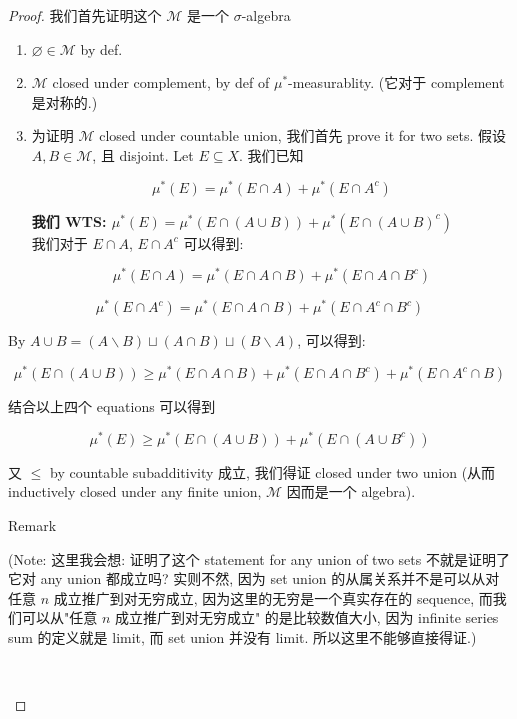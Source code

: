 \documentclass{qlnotes-export}
\begin{document}
\begin{proof}

我们首先证明这个 \(\mathcal{M}\) 是一个 \(\sigma\)-algebra

\begin{enumerate}
\item
  \(\varnothing \in \mathcal{M}\) by def.
\item
  \(\mathcal{M}\) closed under complement, by def of \(\mu^{\ast}\)-measurablity. (它对于 complement 是对称的.)
\item
  为证明 \(\mathcal{M}\) closed under countable union, 我们首先 prove it for two sets. 假设 \(A,B \in \mathcal{M}\), 且 disjoint. Let \(E \subseteq X\). 我们已知

  \[\mu^{\ast}(E) = \mu^{\ast}(E \cap A) + \mu^{\ast}(E \cap A^{c})\]

  \textbf{我们 WTS: \(\mu^{\ast}(E) = \mu^{\ast}(E \cap (A \cup B)) + \mu^{\ast}(E \cap (A \cup B)^{c})\)}\\
  我们对于 \(E \cap A\), \(E \cap A^{c}\) 可以得到:

  \[\mu^{\ast}(E \cap A) = \mu^{\ast}(E \cap A \cap B) + \mu^{\ast}(E \cap A \cap B^{c})\]
\end{enumerate}

\[\mu^{\ast}(E \cap A^{c}) = \mu^{\ast}(E \cap A \cap B) + \mu^{\ast}(E \cap A^{c} \cap B^{c})\]

By \(A \cup B = (A\backslash B) \sqcup (A \cap B) \sqcup (B\backslash A)\), 可以得到:

\[\mu^{\ast}(E \cap (A \cup B)) \geq \mu^{\ast}(E \cap A \cap B) + \mu^{\ast}(E \cap A \cap B^{c}) + \mu^{\ast}(E \cap A^{c} \cap B)\]

结合以上四个 equations 可以得到

\[\mu^{\ast}(E) \geq \mu^{\ast}(E \cap (A \cup B)) + \mu^{\ast}(E \cap (A \cup B^{c}))\]

又 \(\leq\) by countable subadditivity 成立, 我们得证 closed under two union (从而 inductively closed under any finite union, \(\mathcal{M}\) 因而是一个 algebra).\\

\begin{qlremark}{Remark}

(Note: 这里我会想: 证明了这个 statement for any union of two sets 不就是证明了它对 any union 都成立吗? 实则不然, 因为 set union 的从属关系并不是可以从对任意 \(n\) 成立推广到对无穷成立, 因为这里的无穷是一个真实存在的 sequence, 而我们可以从"任意 \(n\) 成立推广到对无穷成立" 的是比较数值大小, 因为 infinite series sum 的定义就是 limit, 而 set union 并没有 limit. 所以这里不能够直接得证.)\\
\strut \\


\end{qlremark}
\end{proof}
\end{document}
